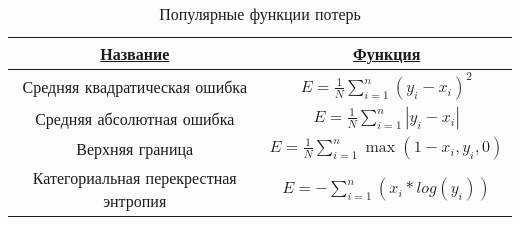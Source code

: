 \begin{table}[H]
  \centering
  \caption{Популярные функции потерь} \label{loss_funcs}
  \begin{tabular}{|c|c|}
    \hline    
    \hyperlink{name}{Название} & \hyperlink{func}{Функция}\\
    \hline
    Средняя квадратическая ошибка & $E=\frac{1}{N}\displaystyle\sum\limits_{i=1}^{n}(y_i - x_i)^2$\\
    \hline
    Средняя абсолютная ошибка & $E=\frac{1}{N}\displaystyle\sum\limits_{i=1}^{n}|y_i - x_i|$ \\
    \hline
    Верхняя граница & $E=\frac{1}{N}\displaystyle\sum\limits_{i=1}^{n}\max(1-x_i, y_i, 0)$ \\
    \hline
    Категориальная перекрестная энтропия & $E=-\displaystyle\sum\limits_{i=1}^{n}(x_i*log(y_i))$ \\
    \hline
  \end{tabular}
\end{table}